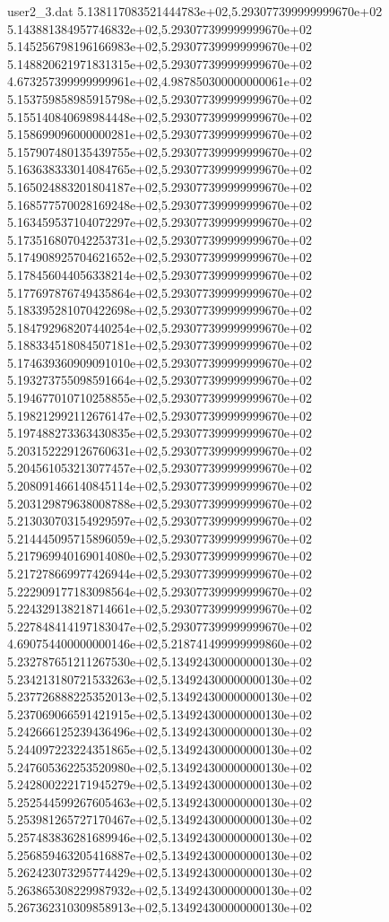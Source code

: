 \begin{filecontents}{user2_3.dat}
5.138117083521444783e+02,5.293077399999999670e+02
5.143881384957746832e+02,5.293077399999999670e+02
5.145256798196166983e+02,5.293077399999999670e+02
5.148820621971831315e+02,5.293077399999999670e+02
4.673257399999999961e+02,4.987850300000000061e+02
5.153759858985915798e+02,5.293077399999999670e+02
5.155140840698984448e+02,5.293077399999999670e+02
5.158699096000000281e+02,5.293077399999999670e+02
5.157907480135439755e+02,5.293077399999999670e+02
5.163638333014084765e+02,5.293077399999999670e+02
5.165024883201804187e+02,5.293077399999999670e+02
5.168577570028169248e+02,5.293077399999999670e+02
5.163459537104072297e+02,5.293077399999999670e+02
5.173516807042253731e+02,5.293077399999999670e+02
5.174908925704621652e+02,5.293077399999999670e+02
5.178456044056338214e+02,5.293077399999999670e+02
5.177697876749435864e+02,5.293077399999999670e+02
5.183395281070422698e+02,5.293077399999999670e+02
5.184792968207440254e+02,5.293077399999999670e+02
5.188334518084507181e+02,5.293077399999999670e+02
5.174639360909091010e+02,5.293077399999999670e+02
5.193273755098591664e+02,5.293077399999999670e+02
5.194677010710258855e+02,5.293077399999999670e+02
5.198212992112676147e+02,5.293077399999999670e+02
5.197488273363430835e+02,5.293077399999999670e+02
5.203152229126760631e+02,5.293077399999999670e+02
5.204561053213077457e+02,5.293077399999999670e+02
5.208091466140845114e+02,5.293077399999999670e+02
5.203129879638008788e+02,5.293077399999999670e+02
5.213030703154929597e+02,5.293077399999999670e+02
5.214445095715896059e+02,5.293077399999999670e+02
5.217969940169014080e+02,5.293077399999999670e+02
5.217278669977426944e+02,5.293077399999999670e+02
5.222909177183098564e+02,5.293077399999999670e+02
5.224329138218714661e+02,5.293077399999999670e+02
5.227848414197183047e+02,5.293077399999999670e+02
4.690754400000000146e+02,5.218741499999999860e+02
5.232787651211267530e+02,5.134924300000000130e+02
5.234213180721533263e+02,5.134924300000000130e+02
5.237726888225352013e+02,5.134924300000000130e+02
5.237069066591421915e+02,5.134924300000000130e+02
5.242666125239436496e+02,5.134924300000000130e+02
5.244097223224351865e+02,5.134924300000000130e+02
5.247605362253520980e+02,5.134924300000000130e+02
5.242800222171945279e+02,5.134924300000000130e+02
5.252544599267605463e+02,5.134924300000000130e+02
5.253981265727170467e+02,5.134924300000000130e+02
5.257483836281689946e+02,5.134924300000000130e+02
5.256859463205416887e+02,5.134924300000000130e+02
5.262423073295774429e+02,5.134924300000000130e+02
5.263865308229987932e+02,5.134924300000000130e+02
5.267362310309858913e+02,5.134924300000000130e+02

\end{filecontents}
